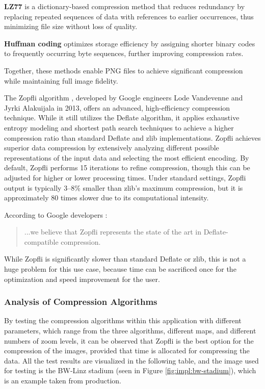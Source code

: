 \begin{compactitem}
\item{}\textbf{LZ77} is a dictionary-based compression method that reduces redundancy by replacing repeated sequences of data with references to earlier occurrences, thus minimizing file size without loss of quality.
\item{}\textbf{Huffman coding} optimizes storage efficiency by assigning shorter binary codes to frequently occurring byte sequences, further improving compression rates.
\end{compactitem}

Together, these methods enable PNG files to achieve significant compression while maintaining full image fidelity.

The Zopfli algorithm \cite{ZopfliGitHub}, developed by Google engineers Lode Vandevenne and Jyrki Alakuijala in 2013, offers an advanced, high-efficiency compression technique. While it still utilizes the Deflate algorithm, it applies exhaustive entropy modeling and shortest path search techniques to achieve a higher compression ratio than standard Deflate and zlib \cite{ZlibGitHub} implementations. Zopfli achieves superior data compression by extensively analyzing different possible representations of the input data and selecting the most efficient encoding. By default, Zopfli performs 15 iterations to refine compression, though this can be adjusted for higher or lower processing times. Under standard settings, Zopfli output is typically 3–8\% smaller than zlib’s maximum compression, but it is approximately 80 times slower due to its computational intensity.

\newpage

According to Google developers \cite{ZopfliGoogleBlog}:

\begin{quote}
    ...we believe that Zopfli represents the state of the art in Deflate-compatible compression.
\end{quote}

While Zopfli is significantly slower than standard Deflate or zlib, this is not a huge problem for this use case, because time can be sacrificed once for the optimization and speed improvement for the user.

\subsubsection{Analysis of Compression Algorithms}

By testing the compression algorithms within this application with different parameters, which range from the three algorithms, different maps, and different numbers of zoom levels, it can be observed that Zopfli is the best option for the compression of the images, provided that time is allocated for compressing the data. All the test results are visualized in the following table, and the image used for testing is the BW-Linz stadium (seen in Figure \ref{fig:impl:bw-stadium}), which is an example taken from production.

